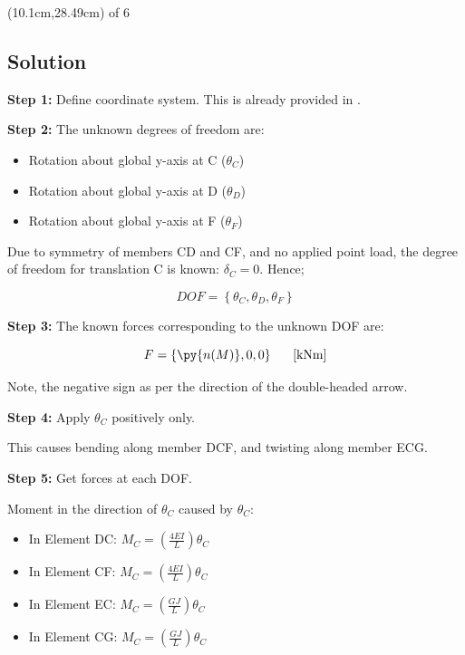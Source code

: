 \documentclass[a4paper,11pt]{article}
\begin{document}
\begin{textblock*}{5cm}(10.1cm,28.49cm)
of 6
\end{textblock*}
\begin{hidden}	
\clearpage
\section{Solution}

\textbf{Step 1:} Define coordinate system. This is already provided in . 

\textbf{Step 2:} The unknown degrees of freedom are: 

\begin{itemize}
	\item Rotation about global y-axis at C ($\theta_C$)
	\item Rotation about global y-axis at D ($\theta_D$)
	\item Rotation about global y-axis at F ($\theta_F$)
\end{itemize} 

Due to symmetry of members CD and CF, and no applied point load, the degree of freedom for translation C is known: $\delta_C = 0$. Hence; 

\begin{equation}
	DOF = \left\{\theta_C,\theta_D,\theta_F\right\}
\end{equation}

\textbf{Step 3:} The known forces corresponding to the unknown DOF are: 

\begin{equation}
	F = \left\{ \py{n(M)},0,0 \right\} \textrm{\hspace{0.5cm} [kNm]}
\end{equation}

Note, the negative sign as per the direction of the double-headed arrow. 
	
\textbf{Step 4:} Apply $\theta_C$ positively only. 

This causes bending along member DCF, and twisting along member ECG. 

\textbf{Step 5:} Get forces at each DOF. 

Moment in the direction of $\theta_C$ caused by $\theta_C$: 

\begin{itemize}
	\item In Element DC: $M_C = \left(\frac{4EI}{L}\right)\theta_C$
	\item In Element CF: $M_C = \left(\frac{4EI}{L}\right)\theta_C$
	\item In Element EC: $M_C = \left(\frac{GJ}{L}\right)\theta_C$
	\item In Element CG: $M_C = \left(\frac{GJ}{L}\right)\theta_C$
\end{itemize}	


\end{hidden}
\end{document}
